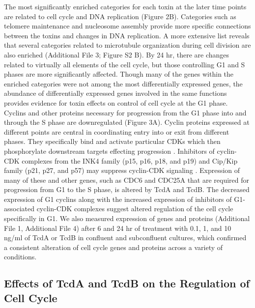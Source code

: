 The most significantly enriched categories for each toxin at the later time points are related to cell cycle and DNA replication (Figure 2B). Categories such as telomere maintenance and nucleosome assembly provide more specific connections between the toxins and changes in DNA replication. A more extensive list reveals that several categories related to microtubule organization during cell division are also enriched (Additional File 3; Figure S2 B). By 24 hr, there are changes related to virtually all elements of the cell cycle, but those controlling G1 and S phases are more significantly affected. Though many of the genes within the enriched categories were not among the most differentially expressed genes, the abundance of differentially expressed genes involved in the same functions provides evidence for toxin effects on control of cell cycle at the G1 phase. Cyclins and other proteins necessary for progression from the G1 phase into and through the S phase are downregulated (Figure 3A). Cyclin proteins expressed at different points are central in coordinating entry into or exit from different phases. They specifically bind and activate particular CDKs which then phosphorylate downstream targets effecting progression \cite{Murray:2004ge}. Inhibitors of cyclin-CDK complexes from the INK4 family (p15, p16, p18, and p19) and Cip/Kip family (p21, p27, and p57) may suppress cyclin-CDK signaling \cite{Denicourt:2004bw}. Expression of many of these and other genes, such as CDC6 and CDC25A that are required for progression from G1 to the S phase, is altered by TcdA and TcdB. The decreased expression of G1 cyclins along with the increased expression of inhibitors of G1-associated cyclin-CDK complexes suggest altered regulation of the cell cycle specifically in G1. We also measured expression of genes and proteins (Additional File 1, Additional File 4) after 6 and 24 hr of treatment with 0.1, 1, and 10 ng/ml of TcdA or TcdB in confluent and subconfluent cultures, which confirmed a consistent alteration of cell cycle genes and proteins across a variety of conditions.

\subsection{Effects of TcdA and TcdB on the Regulation of Cell Cycle}

